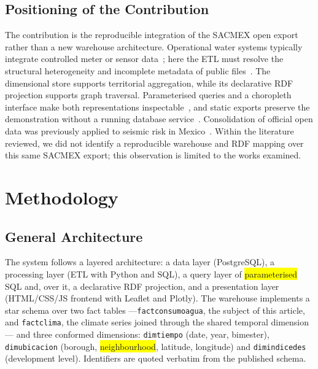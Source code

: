 \documentclass[runningheads]{llncs}
\newif\ifmarcarcambios
\newcommand{\icokg}[1]{\ifmarcarcambios\textcolor{nuevo}{#1}\else#1\fi}
\newcommand{\nuevo}[1]{\colorbox{yellow}{#1}}
\newenvironment{nuevobloque}{}{}
\renewcommand{\_}{\origunderscore\allowbreak}
\begin{document}
\subsection{Positioning of the Contribution}

\begin{nuevobloque}
The contribution is the reproducible integration of the SACMEX open export rather than a new warehouse architecture. Operational water systems typically integrate controlled meter or sensor data~\cite{soares2019,abecker2014}; here the ETL must resolve the structural heterogeneity and incomplete metadata of public files~\cite{berro2015,vetro2016}. The dimensional store supports territorial aggregation, while its declarative RDF projection supports graph traversal. Parameterised queries and a choropleth interface make both representations inspectable~\cite{purves2018}, and static exports preserve the demonstration without a running database service~\cite{sandve2013,hill2023}. Consolidation of official open data was previously applied to seismic risk in Mexico~\cite{villa2026}. Within the literature reviewed, we did not identify a reproducible warehouse and RDF mapping over this same SACMEX export; this observation is limited to the works examined.
\end{nuevobloque}

\section{Methodology}
\label{sec:met}

\subsection{General Architecture}

The system follows a layered architecture: a data layer (PostgreSQL), a processing layer (ETL with Python and SQL), \icokg{a query layer of \nuevo{parameterised} SQL and, over it, a declarative RDF projection}, and a presentation layer (HTML/CSS/JS frontend with Leaflet and Plotly). The warehouse implements a star schema over \icokg{two fact tables ---\texttt{fact\_consumo\_agua}, the subject of this article, and \texttt{fact\_clima}, the climate series joined through the shared temporal dimension--- and three conformed dimensions: \texttt{dim\_tiempo} (date, year, bimester), \texttt{dim\_ubicacion} (borough, \nuevo{neighbourhood}, latitude, longitude) and \texttt{dim\_indice\_des} (development level). Identifiers are quoted verbatim from the published schema.}
\end{document}
